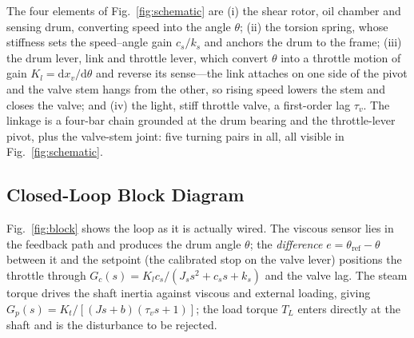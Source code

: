 \documentclass[conference]{IEEEtran}
\begin{document}
The four elements of Fig.~\ref{fig:schematic} are (i) the shear rotor, oil chamber
and sensing drum, converting speed into the angle $\theta$; (ii) the torsion spring,
whose stiffness sets the speed--angle gain $c_s/k_s$ and anchors the drum to the
frame; (iii) the drum lever, link and throttle lever, which convert $\theta$ into a
throttle motion of gain $K_l=\mathrm{d}x_v/\mathrm{d}\theta$ and reverse its
sense---the link attaches on one side of the pivot and the valve stem hangs from the
other, so rising speed lowers the stem and closes the valve; and (iv) the light,
stiff throttle valve, a first-order lag $\tau_v$. The linkage is a four-bar chain
grounded at the drum bearing and the throttle-lever pivot, plus the valve-stem
joint: five turning pairs in all, all visible in Fig.~\ref{fig:schematic}.

\subsection{Closed-Loop Block Diagram}
Fig.~\ref{fig:block} shows the loop as it is actually wired. The viscous sensor
lies in the feedback path and produces the drum angle $\theta$; the \emph{difference}
$e=\theta_{\mathrm{ref}}-\theta$ between it and the setpoint (the calibrated stop on
the valve lever) positions the throttle through
$G_c(s)=K_lc_s/(J_ss^{2}+c_ss+k_s)$ and the valve lag. The steam torque drives the
shaft inertia against viscous and external loading, giving
$G_p(s)=K_t/[(Js+b)(\tau_vs+1)]$; the load torque $T_L$ enters directly at the shaft
and is the disturbance to be rejected.
\end{document}
